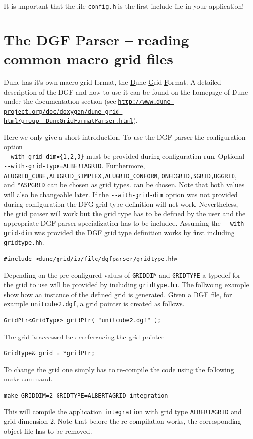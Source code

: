 \documentclass[11pt,a4paper,headinclude,footinclude,DIV16,normalheadings]{scrreprt}
\begin{document}
It is important that the file \lstinline!config.h! is the first
include file in your application!

\section{The DGF Parser -- reading common macro grid files}

Dune has it's own macro grid format, the \underline{D}une \underline{G}rid \underline{F}ormat. 
A detailed description of the DGF and how to use it can be found on the
homepage of Dune under the documentation section (see 
\href{http://www.dune-project.org/doc/doxygen/dune-grid-html/group__DuneGridFormatParser.html}%
{{\small\texttt{http://www.dune-project.org/doc/doxygen/dune-grid-html/group\_\_DuneGridFormatParser.html}}}).

Here we only give a short introduction. To use the DGF parser the configuration 
option \\ 
\lstinline!--with-grid-dim={1,2,3}! must be provided 
during configuration run. Optional \\ 
\lstinline!--with-grid-type=ALBERTAGRID!.
Furthermore, \lstinline!ALUGRID_CUBE,ALUGRID_SIMPLEX,ALUGRID_CONFORM!, 
\lstinline!ONEDGRID,SGRID,UGGRID!, and \lstinline!YASPGRID! can be chosen as grid types.
can be chosen. Note that both values will also be changeable later. 
If the \lstinline!--with-grid-dim! option was not provided during configuration the 
DFG grid type definition will not work. Nevertheless, the grid parser will work 
but the grid type has to be defined by the user and the appropriate DGF parser 
specialization has to be included. 
Assuming the \lstinline!--with-grid-dim! was provided the DGF grid type 
definition works by first including \lstinline!gridtype.hh!.
\begin{lstlisting}[basicstyle=\ttfamily\scriptsize]
#include <dune/grid/io/file/dgfparser/gridtype.hh>
\end{lstlisting}
Depending on the pre-configured values of \lstinline!GRIDDIM! and
\lstinline!GRIDTYPE! a typedef for the grid to use will be provided by
including \lstinline!gridtype.hh!. The follwoing example show how an 
instance of the defined grid is generated. Given a DGF file, for example 
\lstinline!unitcube2.dgf!, a grid pointer is created as follows.
\begin{lstlisting}[basicstyle=\ttfamily\scriptsize]
GridPtr<GridType> gridPtr( "unitcube2.dgf" );
\end{lstlisting}
The grid is accessed be dereferencing the grid pointer.
\begin{lstlisting}[basicstyle=\ttfamily\scriptsize]
GridType& grid = *gridPtr; 
\end{lstlisting}
To change the grid one simply has to re-compile the code using the following make command.
\begin{lstlisting}[basicstyle=\ttfamily\scriptsize]
make GRIDDIM=2 GRIDTYPE=ALBERTAGRID integration 
\end{lstlisting}
This will compile the application \texttt{integration} with grid type \lstinline!ALBERTAGRID! and grid dimension $2$.
Note that before the re-compilation works, 
the corresponding object file has to be removed.
\end{document}
